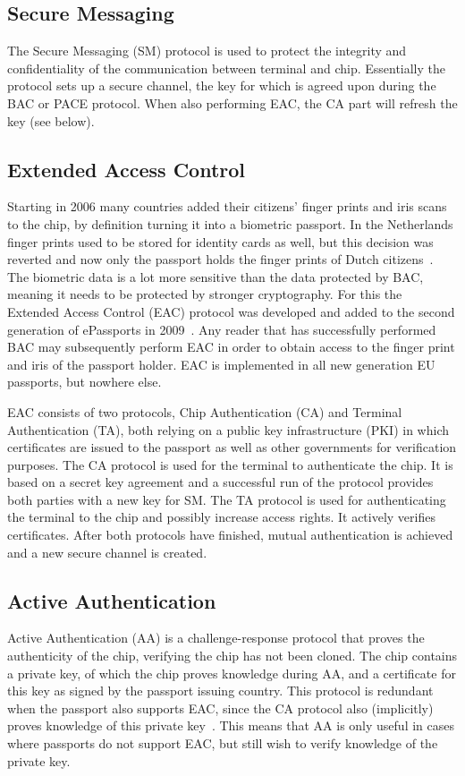 \subsection{Secure Messaging}
The Secure Messaging (SM) protocol is used to protect the integrity and confidentiality of the communication between terminal and chip. Essentially the protocol sets up a secure channel, the key for which is agreed upon during the BAC or PACE protocol. When also performing EAC, the CA part will refresh the key (see below).

\subsection{Extended Access Control}
Starting in 2006 many countries added their citizens' finger prints and iris scans to the chip, by definition turning it into a biometric passport. In the Netherlands finger prints used to be stored for identity cards as well, but this decision was reverted and now only the passport holds the finger prints of Dutch citizens~\cite{idkaart}. The biometric data is a lot more sensitive than the data protected by BAC, meaning it needs to be protected by stronger cryptography. For this the Extended Access Control (EAC) protocol was developed and added to the second generation of ePassports in 2009~\cite{gemalto}. Any reader that has successfully performed BAC may subsequently perform EAC in order to obtain access to the finger print and iris of the passport holder. EAC is implemented in all new generation EU passports, but nowhere else.

EAC consists of two protocols, Chip Authentication (CA) and Terminal Authentication (TA), both relying on a public key infrastructure (PKI) in which certificates are issued to the passport as well as other governments for verification purposes. The CA protocol is used for the terminal to authenticate the chip. It is based on a secret key agreement and a successful run of the protocol provides both parties with a new key for SM. The TA protocol is used for authenticating the terminal to the chip and possibly increase access rights. It actively verifies certificates. After both protocols have finished, mutual authentication is achieved and a new secure channel is created.

\subsection{Active Authentication}
Active Authentication (AA) is a challenge-response protocol that proves the authenticity of the chip, verifying the chip has not been cloned. The chip contains a private key, of which the chip proves knowledge during AA, and a certificate for this key as signed by the passport issuing country. This protocol is redundant when the passport also supports EAC, since the CA protocol also (implicitly) proves knowledge of this private key~\cite{secprivepassport}. This means that AA is only useful in cases where passports do not support EAC, but still wish to verify knowledge of the private key.

